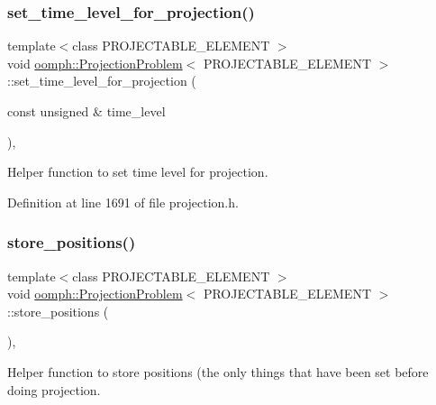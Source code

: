 \subsubsection{\texorpdfstring{set\+\_\+time\+\_\+level\+\_\+for\+\_\+projection()}{set\_time\_level\_for\_projection()}}
{\footnotesize\ttfamily template$<$class P\+R\+O\+J\+E\+C\+T\+A\+B\+L\+E\+\_\+\+E\+L\+E\+M\+E\+NT $>$ \\
void \hyperlink{classoomph_1_1ProjectionProblem}{oomph\+::\+Projection\+Problem}$<$ P\+R\+O\+J\+E\+C\+T\+A\+B\+L\+E\+\_\+\+E\+L\+E\+M\+E\+NT $>$\+::set\+\_\+time\+\_\+level\+\_\+for\+\_\+projection (\begin{DoxyParamCaption}\item[{const unsigned \&}]{time\+\_\+level }\end{DoxyParamCaption})\hspace{0.3cm}{\ttfamily [inline]}, {\ttfamily [private]}}



Helper function to set time level for projection. 



Definition at line 1691 of file projection.\+h.

\mbox{\label{classoomph_1_1ProjectionProblem_a5518d9926a396536ea3d24a13e0a6a71}} 
\subsubsection{\texorpdfstring{store\+\_\+positions()}{store\_positions()}}
{\footnotesize\ttfamily template$<$class P\+R\+O\+J\+E\+C\+T\+A\+B\+L\+E\+\_\+\+E\+L\+E\+M\+E\+NT $>$ \\
void \hyperlink{classoomph_1_1ProjectionProblem}{oomph\+::\+Projection\+Problem}$<$ P\+R\+O\+J\+E\+C\+T\+A\+B\+L\+E\+\_\+\+E\+L\+E\+M\+E\+NT $>$\+::store\+\_\+positions (\begin{DoxyParamCaption}{ }\end{DoxyParamCaption})\hspace{0.3cm}{\ttfamily [inline]}, {\ttfamily [private]}}



Helper function to store positions (the only things that have been set before doing projection. 



